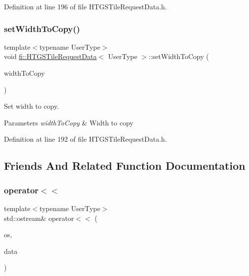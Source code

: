 Definition at line 196 of file H\+T\+G\+S\+Tile\+Request\+Data.\+h.

\mbox{\label{classfi_1_1HTGSTileRequestData_a17c56732d4c5d109289a4447f8b64861}} 
\subsubsection{\texorpdfstring{set\+Width\+To\+Copy()}{setWidthToCopy()}}
{\footnotesize\ttfamily template$<$typename User\+Type$>$ \\
void \hyperlink{classfi_1_1HTGSTileRequestData}{fi\+::\+H\+T\+G\+S\+Tile\+Request\+Data}$<$ User\+Type $>$\+::set\+Width\+To\+Copy (\begin{DoxyParamCaption}\item[{uint32\+\_\+t}]{width\+To\+Copy }\end{DoxyParamCaption})\hspace{0.3cm}{\ttfamily [inline]}}



Set width to copy. 


\begin{DoxyParams}{Parameters}
{\em width\+To\+Copy} & Width to copy \\
\hline
\end{DoxyParams}


Definition at line 192 of file H\+T\+G\+S\+Tile\+Request\+Data.\+h.



\subsection{Friends And Related Function Documentation}
\mbox{\label{classfi_1_1HTGSTileRequestData_a5fc084a54b46bdd6bf5588119505e047}} 
\subsubsection{\texorpdfstring{operator$<$$<$}{operator<<}}
{\footnotesize\ttfamily template$<$typename User\+Type$>$ \\
std\+::ostream\& operator$<$$<$ (\begin{DoxyParamCaption}\item[{std\+::ostream \&}]{os,  }\item[{const \hyperlink{classfi_1_1HTGSTileRequestData}{H\+T\+G\+S\+Tile\+Request\+Data}$<$ User\+Type $>$ \&}]{data }\end{DoxyParamCaption})\hspace{0.3cm}{\ttfamily [friend]}}



